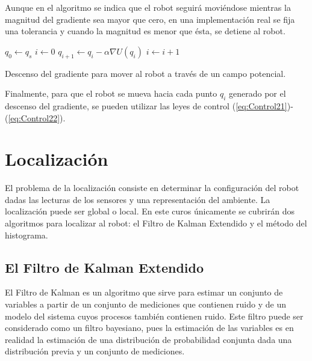\documentclass[a4paper]{article}
\begin{document}
Aunque en el algoritmo se indica que el robot seguirá moviéndose mientras la magnitud del gradiente sea mayor que cero, en una implementación real se fija una tolerancia y cuando la magnitud es menor que ésta, se detiene al robot. 
\begin{algorithm}
\DontPrintSemicolon
{}
$q_0 \leftarrow q_s$\;
$i \leftarrow 0$\;
{
  $q_{i+1} \leftarrow q_i - \alpha\nabla U(q_i)$\;
  $i \leftarrow i + 1$
}
  \caption{Descenso del gradiente para mover al robot a través de un campo potencial.}
  \label{alg:PotFields}
\end{algorithm}

Finalmente, para que el robot se mueva hacia cada punto $q_i$ generado por el descenso del gradiente, se pueden utilizar las leyes de control (\ref{eq:Control21})-(\ref{eq:Control22}).





\section{Localización}
El problema de la localización consiste en determinar la configuración del robot dadas las lecturas de los sensores y una representación del ambiente. La localización puede ser global o local. En este curos únicamente se cubrirán dos algoritmos para localizar al robot: el Filtro de Kalman Extendido y el método del histograma. 

\subsection{El Filtro de Kalman Extendido}
El Filtro de Kalman es un algoritmo que sirve para estimar un conjunto de variables a partir de un conjunto de mediciones que contienen ruido y de un modelo del sistema cuyos procesos también contienen ruido. Este filtro puede ser considerado como un filtro bayesiano, pues la estimación de las variables es en realidad la estimación de una distribución de probabilidad conjunta dada una distribución previa y un conjunto de mediciones. 
\end{document}
